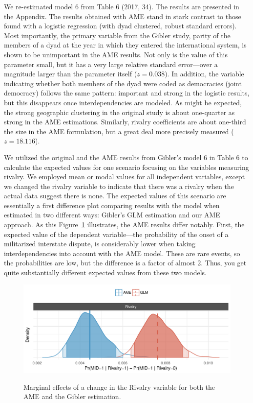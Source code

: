 We re-estimated model 6 from Table 6 (2017, 34). The results are presented in the Appendix. The results obtained with AME stand in stark contrast to those found with a logistic regression (with dyad clustered, robust standard errors).  Most importantly, the primary variable from the Gibler study, parity of the members of a dyad at the year in which they entered the international system, is shown to be unimportant in the AME results.  Not only is the value of this parameter small, but it has a very large relative standard error---over a magnitude larger than the parameter itself ($z= 0.038$). In addition, the variable indicating whether both members of the dyad were coded as democracies (joint democracy) follows the same pattern: important and strong in the logistic results, but this disappears once interdependencies are modeled.  As might be expected, the strong geographic clustering in the original study is about one-quarter as strong in the AME estimations. Similarly, rivalry coefficients are about one-third the size in the AME formulation, but a great deal more precisely measured ($z=18.116$). 

We utilized the original and the AME results from Gibler's model 6 in Table 6 to calculate the expected values for one scenario focusing on the variables measuring rivalry.  We employed mean or modal values for all independent variables, except we changed the rivalry variable to indicate that there was a rivalry when the actual data suggest there is none.  The expected values of this scenario are essentially a first difference plot comparing results with the model when estimated in two different ways: Gibler's GLM estimation and our AME approach.  As this Figure~\ref{fig:gibmargeff} illustrates, the AME results differ notably. First, the expected value of the dependent variable---the probability of the onset of a militarized interstate dispute, is considerably lower when taking interdependencies into account with the AME model.  These are rare events, so the probabilities are low, but the difference is a factor of almost 2. Thus, you get quite substantially different expected values from these two models.  

\begin{figure}
	\caption{Marginal effects of a change in the Rivalry variable for both the AME and the Gibler estimation.  \label{fig:gibmargeff}}
	\includegraphics[width=\textwidth]{gibler_margeff.pdf}
 	\label{fig:gibmargeff}
 \end{figure}

